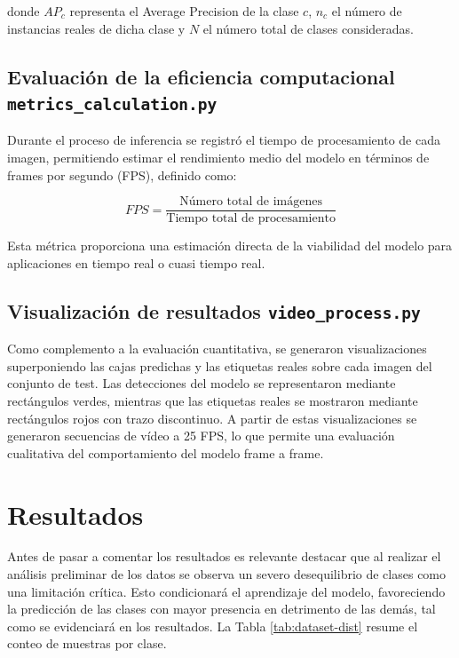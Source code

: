 \documentclass{article}
\begin{document}
	donde $AP_c$ representa el Average Precision de la clase $c$, $n_c$ el número de instancias reales de dicha clase y $N$ el número total de clases consideradas.
	
	
	\subsection{Evaluación de la eficiencia computacional \texttt{metrics\_calculation.py}}
	
	Durante el proceso de inferencia se registró el tiempo de procesamiento de cada imagen, permitiendo estimar el rendimiento medio del modelo en términos de frames por segundo (FPS), definido como:
	
	\begin{equation}
		FPS = \frac{\text{Número total de imágenes}}{\text{Tiempo total de procesamiento}}
	\end{equation}
	
	Esta métrica proporciona una estimación directa de la viabilidad del modelo para aplicaciones en tiempo real o cuasi tiempo real.
	
	\subsection{Visualización de resultados \texttt{video\_process.py}}
	
	Como complemento a la evaluación cuantitativa, se generaron visualizaciones superponiendo las cajas predichas y las etiquetas reales sobre cada imagen del conjunto de test. Las detecciones del modelo se representaron mediante rectángulos verdes, mientras que las etiquetas reales se mostraron mediante rectángulos rojos con trazo discontinuo. A partir de estas visualizaciones se generaron secuencias de vídeo a 25 FPS, lo que permite una evaluación cualitativa del comportamiento del modelo frame a frame.
	
\section{Resultados}

Antes de pasar a comentar los resultados es relevante destacar que al realizar el análisis preliminar de los datos se observa un severo desequilibrio de clases como una limitación crítica. Esto condicionará el aprendizaje del modelo, favoreciendo la predicción de las clases con mayor presencia en detrimento de las demás, tal como se evidenciará en los resultados. La Tabla \ref{tab:dataset-dist} resume el conteo de muestras por clase.
\end{document}
